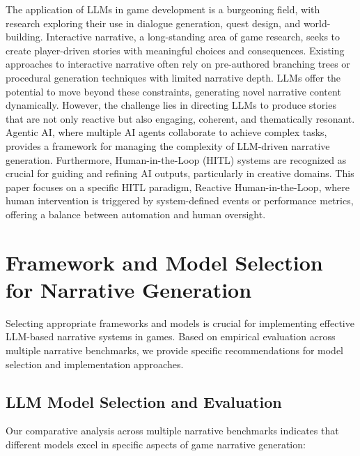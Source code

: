 \documentclass{article}
\begin{document}
The application of LLMs in game development is a burgeoning field, with research exploring their use in dialogue generation, quest design, and world-building.  Interactive narrative, a long-standing area of game research, seeks to create player-driven stories with meaningful choices and consequences.  Existing approaches to interactive narrative often rely on pre-authored branching trees or procedural generation techniques with limited narrative depth. LLMs offer the potential to move beyond these constraints, generating novel narrative content dynamically.  However, the challenge lies in directing LLMs to produce stories that are not only reactive but also engaging, coherent, and thematically resonant.  Agentic AI, where multiple AI agents collaborate to achieve complex tasks, provides a framework for managing the complexity of LLM-driven narrative generation.  Furthermore, Human-in-the-Loop (HITL) systems are recognized as crucial for guiding and refining AI outputs, particularly in creative domains.  This paper focuses on a specific HITL paradigm, Reactive Human-in-the-Loop, where human intervention is triggered by system-defined events or performance metrics, offering a balance between automation and human oversight.

\section{Framework and Model Selection for Narrative Generation}

Selecting appropriate frameworks and models is crucial for implementing effective LLM-based narrative systems in games. Based on empirical evaluation across multiple narrative benchmarks, we provide specific recommendations for model selection and implementation approaches.

\subsection{LLM Model Selection and Evaluation}

Our comparative analysis across multiple narrative benchmarks indicates that different models excel in specific aspects of game narrative generation:
\end{document}

